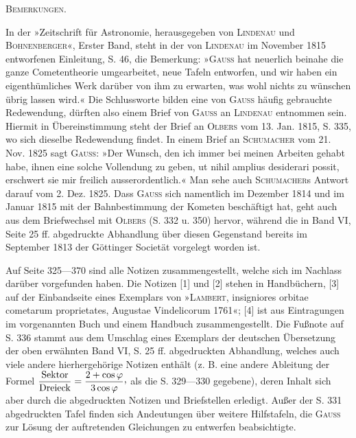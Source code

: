 \par\bigskip
\hypertarget{native-379-parabolic-remarks}{}\label{native-379-parabolic-remarks}
\begin{center}\textsc{Bemerkungen.}\end{center}
\begingroup\small
\noindent\hspace*{\parindent}In der »Zeitschrift für Astronomie, herausgegeben von \textsc{Lindenau} und \textsc{Bohnenberger}«, Erster Band, steht in der von \textsc{Lindenau} im November 1815 entworfenen Einleitung, S. 46, die Bemerkung: »\textsc{Gauss} hat neuerlich beinahe die ganze Cometentheorie umgearbeitet, neue Tafeln entworfen, und wir haben ein eigenthümliches Werk darüber von ihm zu erwarten, was wohl nichts zu wünschen übrig lassen wird.« Die Schlussworte bilden eine von \textsc{Gauss} häufig gebrauchte Redewendung, dürften also einem Brief von \textsc{Gauss} an \textsc{Lindenau} entnommen sein. Hiermit in Übereinstimmung steht der Brief an \textsc{Olbers} vom 13. Jan. 1815, S. 335, wo sich dieselbe Redewendung findet. In einem Brief an \textsc{Schumacher} vom 21. Nov. 1825 sagt \textsc{Gauss}: »Der Wunsch, den ich immer bei meinen Arbeiten gehabt habe, ihnen eine solche Vollendung zu geben, ut nihil amplius desiderari possit, erschwert sie mir freilich ausserordentlich.« Man sehe auch \textsc{Schumacher}s Antwort darauf vom 2. Dez. 1825. Dass \textsc{Gauss} sich namentlich im Dezember 1814 und im Januar 1815 mit der Bahnbestimmung der Kometen beschäftigt hat, geht auch aus dem Briefwechsel mit \textsc{Olbers} (S. 332 u. 350) hervor, während die in Band VI, Seite 25 ff. abgedruckte Abhandlung über diesen Gegenstand bereits im September 1813 der Göttinger Societät vorgelegt worden ist.
\par
{}
\noindent\hspace*{\parindent}Auf Seite 325—370 sind alle Notizen zusammengestellt, welche sich im Nachlass darüber vorgefunden haben. Die Notizen [1] und [2] stehen in Handbüchern, [3] auf der Einbandseite eines Exemplars von »\textsc{Lambert}, insigniores orbitae cometarum proprietates, Augustae Vindelicorum 1761«; [4] ist aus Eintragungen im vorgenannten Buch und einem Handbuch zusammengestellt. Die Fußnote auf S. 336 stammt aus dem Umschlag eines Exemplars der deutschen Übersetzung der oben erwähnten Band VI, S. 25 ff. abgedruckten Abhandlung, welches auch viele andere hierhergehörige Notizen enthält (z. B. eine andere Ableitung der Formel \(\dfrac{\text{Sektor}}{\text{Dreieck}}=\dfrac{2+\cos\varphi}{3\cos\varphi}\mathpunct{\text{\raisebox{.45ex}{,}}}\) als die S. 329—330 gegebene), deren Inhalt sich aber durch die abgedruckten Notizen und Briefstellen erledigt. Außer der S. 331 abgedruckten Tafel finden sich Andeutungen über weitere Hilfstafeln, die \textsc{Gauss} zur Lösung der auftretenden Gleichungen zu entwerfen beabsichtigte.
